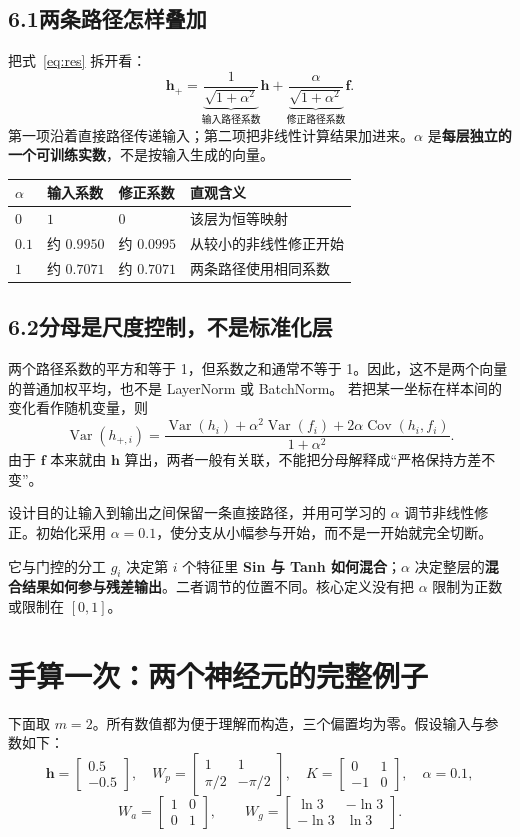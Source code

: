 \documentclass[UTF8,11pt,a4paper,fontset=fandol]{ctexart}
\newcommand{\purpose}[1]{\begin{explain}{设计目的}#1\end{explain}}
\newcommand{\newsection}[1]{\clearpage\section{#1}}
\begin{document}
\subsection*{6.1\quad 两条路径怎样叠加}
把式~\eqref{eq:res} 拆开看：
\[
\boldsymbol{h}_{+}=
\underbrace{\frac{1}{\sqrt{1+\alpha^2}}}_{\text{输入路径系数}}\boldsymbol{h}
+\underbrace{\frac{\alpha}{\sqrt{1+\alpha^2}}}_{\text{修正路径系数}}\boldsymbol{f}.
\]
第一项沿着直接路径传递输入；第二项把非线性计算结果加进来。$\alpha$ 是\textbf{每层独立的一个可训练实数}，不是按输入生成的向量。
\par\smallskip\noindent\begin{tabularx}{\linewidth}{@{}p{25mm}p{37mm}p{37mm}Y@{}}
\toprule
$\alpha$&输入系数&修正系数&直观含义\\\midrule
$0$&$1$&$0$&该层为恒等映射\\
$0.1$&约 $0.9950$&约 $0.0995$&从较小的非线性修正开始\\
$1$&约 $0.7071$&约 $0.7071$&两条路径使用相同系数\\\bottomrule
\end{tabularx}\par\smallskip
\subsection*{6.2\quad 分母是尺度控制，不是标准化层}
两个路径系数的平方和等于 1，但系数之和通常不等于 1。因此，这不是两个向量的普通加权平均，也不是 LayerNorm 或 BatchNorm。
若把某一坐标在样本间的变化看作随机变量，则
\[
\operatorname{Var}(h_{+,i})=
\frac{\operatorname{Var}(h_i)+\alpha^2\operatorname{Var}(f_i)
+2\alpha\operatorname{Cov}(h_i,f_i)}{1+\alpha^2}.
\]
由于 $\boldsymbol{f}$ 本来就由 $\boldsymbol{h}$ 算出，两者一般有关联，不能把分母解释成“严格保持方差不变”。
\purpose{让输入到输出之间保留一条直接路径，并用可学习的 $\alpha$ 调节非线性修正。初始化采用 $\alpha=0.1$，使分支从小幅参与开始，而不是一开始就完全切断。}
\begin{notebox}{它与门控的分工}
$g_i$ 决定第 $i$ 个特征里 \textbf{Sin 与 Tanh 如何混合}；$\alpha$ 决定整层的\textbf{混合结果如何参与残差输出}。二者调节的位置不同。核心定义没有把 $\alpha$ 限制为正数或限制在 $[0,1]$。
\end{notebox}

\newsection{手算一次：两个神经元的完整例子}
下面取 $m=2$。所有数值都为便于理解而构造，三个偏置均为零。假设输入与参数如下：
\[
\boldsymbol{h}=\begin{bmatrix}0.5\\-0.5\end{bmatrix},\quad
W_p=\begin{bmatrix}1&1\\\pi/2&-\pi/2\end{bmatrix},\quad
K=\begin{bmatrix}0&1\\-1&0\end{bmatrix},\quad\alpha=0.1,
\]
\[
W_a=\begin{bmatrix}1&0\\0&1\end{bmatrix},\qquad
W_g=\begin{bmatrix}\ln3&-\ln3\\-\ln3&\ln3\end{bmatrix}.
\]
\end{document}
